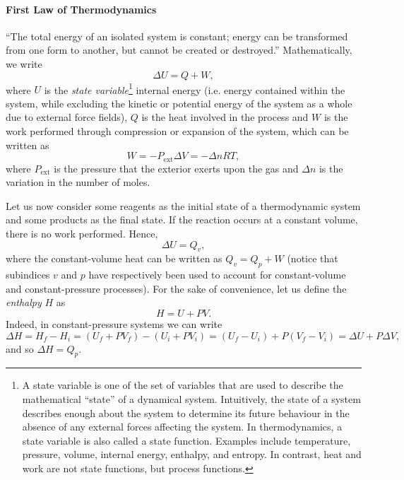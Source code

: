\documentclass[a4paper,10pt]{article}
\theoremstyle{plain}
\theoremstyle{definition}
\theoremstyle{remark}
\newcommand{\quotes}[1]{``#1''}
\begin{document}
\paragraph{First Law of Thermodynamics}\quotes{The total energy of an isolated system is constant; energy can be transformed from one form to another, but cannot be created or destroyed.} Mathematically, we write
\begin{equation}
\Delta U = Q + W,
\end{equation}
where $U$ is the \textit{state variable}\footnote{A state variable is one of the set of variables that are used to describe the mathematical \quotes{state} of a dynamical system. Intuitively, the state of a system describes enough about the system to determine its future behaviour in the absence of any external forces affecting the system. In thermodynamics, a state variable is also called a state function. Examples include temperature, pressure, volume, internal energy, enthalpy, and entropy. In contrast, heat and work are not state functions, but process functions.} internal energy (i.e. energy contained within the system, while excluding the kinetic or potential energy of the system as a whole due to external force fields), $Q$ is the heat involved in the process  and $W$ is the work performed through compression or expansion of the system, which can be written as
\begin{equation}
W = -P_{\text{ext}}\Delta V = -\Delta nRT,
\end{equation}
where $P_{\text{ext}}$ is the pressure that the exterior exerts upon the gas and $\Delta n$ is the variation in the number of moles.

Let us now consider some reagents as the initial state of a thermodynamic system and some products as the final state. If the reaction occurs at a constant volume, there is no work performed. Hence,
\begin{equation}
\Delta U = Q_v,
\end{equation}
where the constant-volume heat can be written as  $ Q_v = Q_p + W$ (notice that subindices $v$ and $p$  have respectively been used to account for constant-volume and constant-pressure processes). For the sake of convenience, let us define the \textit{enthalpy} $H$ as
\begin{equation}
H = U + PV.
\end{equation}
Indeed, in constant-pressure systems we can write
\begin{equation}
\Delta H = H_f - H_i = (U_f + PV_f) - (U_i + PV_i) = (U_f - U_i) + P(V_f - V_i) = \Delta U + P\Delta V,
\end{equation}
and so $\Delta H = Q_p$.
\end{document}
